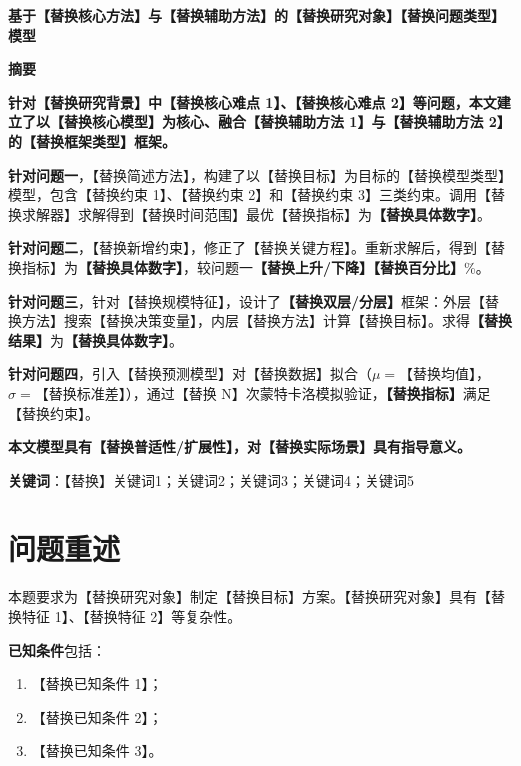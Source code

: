 \documentclass[12pt,a4paper,fontset=fandol]{ctexart}
\newcommand{\abstractpage}[2]{%
    \thispagestyle{plain}%
    \pagenumbering{arabic}%
    \setcounter{page}{1}%
    \begin{center}
        {\bfseries\zihao{3} #1}%
    \end{center}
    \vspace{0.5em}
    \begin{center}
        {\bfseries\zihao{4} 摘\quad 要}%
    \end{center}
    \vspace{0.5em}
    #2%
    \vspace{1em}
    \par\noindent\textbf{关键词}：【替换】关键词1；关键词2；关键词3；关键词4；关键词5
    \newpage
}
\newcommand{\res}[1]{\textbf{#1}}
\begin{document}
\abstractpage{基于【替换核心方法】与【替换辅助方法】的【替换研究对象】【替换问题类型】模型}%
{%
\textbf{针对【替换研究背景】中【替换核心难点 1】、【替换核心难点 2】等问题，本文建立了以【替换核心模型】为核心、融合【替换辅助方法 1】与【替换辅助方法 2】的【替换框架类型】框架。}

\textbf{针对问题一}，【替换简述方法】，构建了以【替换目标】为目标的【替换模型类型】模型，包含【替换约束 1】、【替换约束 2】和【替换约束 3】三类约束。调用【替换求解器】求解得到【替换时间范围】最优【替换指标】为\res{【替换具体数字】}。

\textbf{针对问题二}，【替换新增约束】，修正了【替换关键方程】。重新求解后，得到【替换指标】为\res{【替换具体数字】}，较问题一\res{【替换上升/下降】}\res{【替换百分比】}\%。

\textbf{针对问题三}，针对【替换规模特征】，设计了\res{【替换双层/分层】}框架：外层【替换方法】搜索【替换决策变量】，内层【替换方法】计算【替换目标】。求得\res{【替换结果】}为\res{【替换具体数字】}。

\textbf{针对问题四}，引入【替换预测模型】对【替换数据】拟合（$\mu=$【替换均值】，$\sigma=$【替换标准差】），通过【替换 N】次蒙特卡洛模拟验证，\res{【替换指标】}满足【替换约束】。

\textbf{本文模型具有【替换普适性/扩展性】，对【替换实际场景】具有指导意义。}
}


\section{问题重述}

本题要求为【替换研究对象】制定【替换目标】方案。【替换研究对象】具有【替换特征 1】、【替换特征 2】等复杂性。

\textbf{已知条件}包括：
\begin{enumerate}
    \item 【替换已知条件 1】；
    \item 【替换已知条件 2】；
    \item 【替换已知条件 3】。
\end{enumerate}
\end{document}
